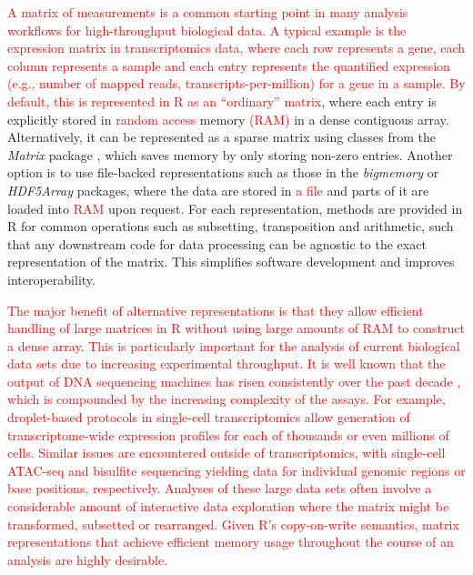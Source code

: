 \documentclass[10pt,letterpaper]{article}
\newcommand{\revised}[1]{\textcolor{red}{#1}}
\begin{document}
\revised{A matrix of measurements is a common starting point in many analysis workflows for high-throughput biological data.
A typical example is the expression matrix in transcriptomics data, where each row represents a gene, each column represents a sample and each entry represents the quantified expression (e.g., number of mapped reads, transcripts-per-million) for a gene in a sample.
By default, this is represented in R as an ``ordinary'' matrix}, where each entry is explicitly stored in \revised{random access} memory \revised{(RAM)} in a dense contiguous array.
Alternatively, it can be represented as a sparse matrix using classes from the \textit{Matrix} package \cite{bates2017matrix}, which saves memory by only storing non-zero entries.
Another option is to use file-backed representations such as those in the \textit{bigmemory} \cite{kane2013scalable} or \textit{HDF5Array} packages, where the data are stored in \revised{a file} and parts of it are loaded into \revised{RAM} upon request.
For each representation, methods are provided in R for common operations such as subsetting, transposition and arithmetic, such that any downstream code for data processing can be agnostic to the exact representation of the matrix.
This simplifies software development and improves interoperability.

\revised{The major benefit of alternative representations is that they allow efficient handling of large matrices in R without using large amounts of RAM to construct a dense array.
This is particularly important for the analysis of current biological data sets due to increasing experimental throughput.
It is well known that the output of DNA sequencing machines has risen consistently over the past decade \cite{reuter2015high}, which is compounded by the increasing complexity of the assays.
For example, droplet-based protocols in single-cell transcriptomics \cite{macosko2015highly,klein2015droplet,zheng2017massively} allow generation of transcriptome-wide expression profiles for each of thousands or even millions of cells.
Similar issues are encountered outside of transcriptomics, with single-cell ATAC-seq \cite{buenrostro2015single} and bisulfite sequencing \cite{smallwood2014single} yielding data for individual genomic regions or base positions, respectively.
Analyses of these large data sets often involve a considerable amount of interactive data exploration where the matrix might be transformed, subsetted or rearranged.
Given R's copy-on-write semantics, matrix representations that achieve efficient memory usage throughout the course of an analysis are highly desirable.
}
\end{document}

